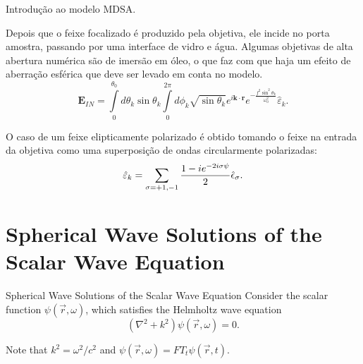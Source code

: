 \documentclass[10pt]{beamer}
\begin{document}
\begin{frame}[fragile]{Introdução ao modelo MDSA.}

    \begin{center}
        Depois que o feixe focalizado é produzido pela objetiva, ele incide no porta amostra, passando por uma interface de vidro e água. Algumas objetivas de alta abertura numérica são de imersão em óleo, o que faz com que haja um efeito de aberração esférica que deve ser levado em conta no modelo.
        \begin{equation}
        \mathbf{E}_{IN}=\int\limits_0^{\theta_0} d\theta_k \sin\theta_k \int\limits_0^{2\pi} d\phi_k\sqrt{\sin\theta_k} e^{i\mathbf{k}\cdot\mathbf{r}} e^{-\frac{f^2\sin^2\theta_k}{\omega_0^2}} \hat{\varepsilon}_k.        
        \end{equation}

        O caso de um feixe elipticamente polarizado é obtido tomando o feixe na entrada da objetiva como uma superposição de ondas circularmente polarizadas:
        \begin{equation}
        \hat{\varepsilon}_k = \sum \limits_{\sigma = +1,-1} \frac{1 - ie^{-2i\sigma \psi}}{2} \hat{\bf{\epsilon}}_\sigma .     
        \end{equation}

    \end{center}

\end{frame}



\section{Spherical Wave Solutions of the Scalar Wave Equation}


\begin{frame}[fragile]{Spherical Wave Solutions of the Scalar Wave Equation}
    Consider the scalar function $\psi(\vec{r},\omega)$, which satisfies the Helmholtz wave equation\\
      \begin{equation*}
        \left(\nabla^2 + k^2\right)\psi(\vec{r},\omega) = 0 .
      \end{equation*}

    Note that $k^2=\omega^2/c^2$ and $\psi(\vec{r},\omega)=FT_t{\psi(\vec{r},t)}$.

\end{frame}
\end{document}
